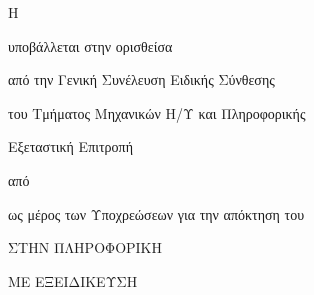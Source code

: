 \makeatletter

{\LARGE \@titleGr}

{\Large
    \vfill \vfill Η \MakeUppercase{\csethesisTypeGr}

    \vfill        υποβάλλεται στην ορισθείσα

    \vfill        από την Γενική Συνέλευση Ειδικής Σύνθεσης

                  του Τμήματος Μηχανικών Η/Υ και Πληροφορικής

                  Εξεταστική Επιτροπή

    \vfill        από \@Arthro

    \vfill        {\LARGE \@Aitiatiki}

    \vfill        ως μέρος των Υποχρεώσεων για την απόκτηση του

    \vfill        \MakeUppercase{\csediplwmaGr}

    \ifPhD\else
                  ΣΤΗΝ ΠΛΗΡΟΦΟΡΙΚΗ

                  ΜΕ ΕΞΕΙΔΙΚΕΥΣΗ

                  \EkseidikseusiGr
    \fi

    \vfill \vfill \@dateGr
}

\makeatother
\clearpage
